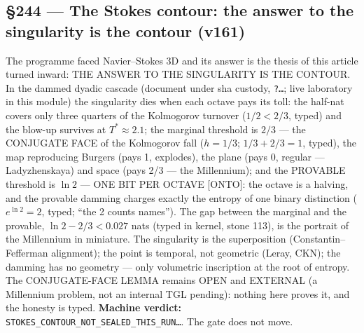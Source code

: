 \documentclass[11pt]{article}
\theoremstyle{definition}\newtheorem{deriv}{Derivation}
\begin{document}
\subsection*{\S244 --- The Stokes contour: the answer to the singularity is the contour (v161)}The programme faced Navier--Stokes 3D and its answer is the thesis of this article turned inward: THE ANSWER TO THE SINGULARITY IS THE CONTOUR. In the dammed dyadic cascade (document under sha custody, \texttt{?\ldots}; live laboratory in this module) the singularity dies when each octave pays its toll: the half-nat covers only three quarters of the Kolmogorov turnover ($1/2 < 2/3$, typed) and the blow-up survives at $T^*{\approx}2.1$; the marginal threshold is $2/3$ --- the CONJUGATE FACE of the Kolmogorov fall ($h{=}1/3$; $1/3{+}2/3{=}1$, typed), the map reproducing Burgers (pays 1, explodes), the plane (pays 0, regular --- Ladyzhenskaya) and space (pays 2/3 --- the Millennium); and the PROVABLE threshold is $\ln 2$ --- ONE BIT PER OCTAVE [ONTO]: the octave is a halving, and the provable damming charges exactly the entropy of one binary distinction ($e^{\ln 2}{=}2$, typed; ``the 2 counts names''). The gap between the marginal and the provable, $\ln 2 - 2/3 < 0.027$ nats (typed in kernel, stone 113), is the portrait of the Millennium in miniature. The singularity is the superposition (Constantin--Fefferman alignment); the point is temporal, not geometric (Leray, CKN); the damming has no geometry --- only volumetric inscription at the root of entropy. The CONJUGATE-FACE LEMMA remains OPEN and EXTERNAL (a Millennium problem, not an internal TGL pending): nothing here proves it, and the honesty is typed. \textbf{Machine verdict:} \texttt{STOKES\_CONTOUR\_NOT\_SEALED\_THIS\_RUN\ldots}. The gate does not move.
\end{document}
